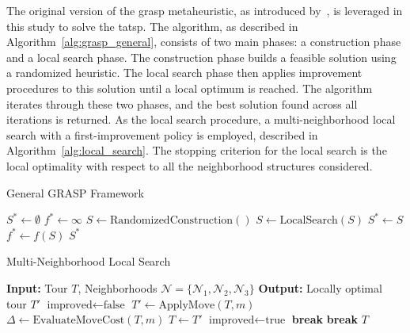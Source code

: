\documentclass[twocolumn]{article} %
\begin{document}
The original version of the \gls{grasp} metaheuristic, as introduced by~\cite{Feo1995}, is leveraged in this study to solve the \gls{tatsp}. 
The algorithm, as described in Algorithm~\ref{alg:grasp_general}, consists of two main phases: a construction phase and a local search phase.
The construction phase builds a feasible solution using a randomized heuristic. The local search phase then applies improvement procedures to this solution until a local optimum is reached.
The algorithm iterates through these two phases, and the best solution found across all iterations is returned.
As the local search procedure, a multi-neighborhood local search with a first-improvement policy is employed, described in Algorithm~\ref{alg:local_search}.
The stopping criterion for the local search is the local optimality with respect to all the neighborhood structures considered.

\begin{algorithm}
\caption{General GRASP Framework}
\label{alg:grasp_general}
\begin{algorithmic}[1]
\State $S^* \leftarrow \emptyset$ 
\State $f^* \leftarrow \infty$ 
    \State $S \leftarrow \text{RandomizedConstruction}()$
    \State $S \leftarrow \text{LocalSearch}(S)$
        \State $S^* \leftarrow S$
        \State $f^* \leftarrow f(S)$
    \EndIf
\EndFor
\State \Return $S^*$
\end{algorithmic}
\end{algorithm}


\begin{algorithm}
\caption{Multi-Neighborhood Local Search}
\label{alg:local_search}
\begin{algorithmic}[1]
\State \textbf{Input:} Tour $T$, Neighborhoods $\mathcal{N} = \{\mathcal{N}_1, \mathcal{N}_2, \mathcal{N}_3\}$
\State \textbf{Output:} Locally optimal tour $T'$
\Repeat
    \State $\text{improved} \leftarrow \text{false}$
            \State $T' \leftarrow \text{ApplyMove}(T, m)$
            \State $\Delta \leftarrow \text{EvaluateMoveCost}(T, m)$ 
                \State $T \leftarrow T'$
                \State $\text{improved} \leftarrow \text{true}$
                \State \textbf{break} 
            \EndIf
        \EndFor
            \State \textbf{break} 
        \EndIf
    \EndFor
{}
\State \Return $T$
\end{algorithmic}
\end{algorithm}
\end{document}
